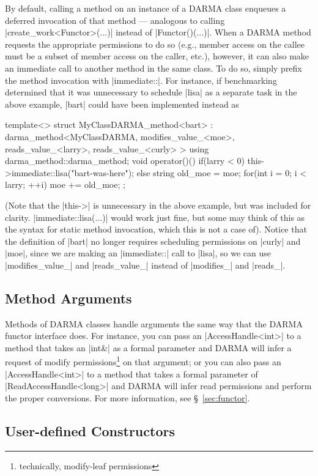 By default, calling a method on an instance of a DARMA class enqueues a deferred
invocation of that method --- analogous to calling |create_work<Functor>(...)|
instead of |Functor()(...)|.  When a DARMA method requests the appropriate
permissions to do so (e.g., member access on the callee must be a subset of
member access on the caller, etc.), however, it can also make an immediate call
to another method in the same class.  To do so, simply prefix the method
invocation with |immediate::|.  For instance, if benchmarking determined that
it was unnecessary to schedule |lisa| as a separate task in the above example,
|bart| could have been implemented instead as
\begin{CppCodeNumb}
template<>
struct MyClassDARMA_method<bart>
  : darma_method<MyClassDARMA,
      modifies_value_<moe>,
      reads_value_<larry>,
      reads_value_<curly>
    >
{
  using darma_method::darma_method;
  void operator()() {
    if(larry < 0) this->immediate::lisa("bart-was-here");
    else {
      string old_moe = moe;
      for(int i = 0; i < larry; ++i) moe += old_moe;
    }
  }
};
\end{CppCodeNumb}
(Note that the |this->| is unnecessary in the above example, but was included
for clarity.  |immediate::lisa(...)| would work just fine, but
some may think of this as the syntax for static method invocation, which this
is not a case of).  Notice that the definition of |bart| no longer requires
scheduling permissions on |curly| and |moe|, since we are making an
|immediate::| call to |lisa|, so we can use |modifies_value_| and |reads_value_|
instead of |modifies_| and |reads_|.

\subsection{Method Arguments}

Methods of DARMA classes handle arguments the same way that the DARMA functor
interface does.  For instance, you can pass an |AccessHandle<int>| to a method
that takes an |int&| as a formal parameter and DARMA will infer a request of
modify permissions\footnote{technically, modify-leaf permissions} on that
argument; or you can also pass an |AccessHandle<int>| to a method that takes a
formal parameter of |ReadAccessHandle<long>| and DARMA will infer read
permissions and perform the proper conversions.  For more information, see
\S~\ref{sec:functor}.

\subsection{User-defined Constructors}

